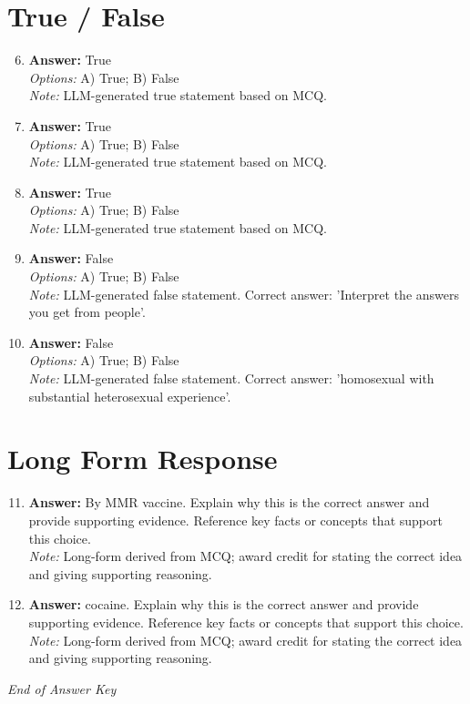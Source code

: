 \documentclass[12pt]{article}
\begin{document}
\section*{True / False}
\begin{enumerate}[label=\arabic*.]
\setcounter{enumi}{5}
\item \textbf{Answer:} True
\\ \textit{Options:} A) True; B) False
\\ \textit{Note:} LLM-generated true statement based on MCQ.
\item \textbf{Answer:} True
\\ \textit{Options:} A) True; B) False
\\ \textit{Note:} LLM-generated true statement based on MCQ.
\item \textbf{Answer:} True
\\ \textit{Options:} A) True; B) False
\\ \textit{Note:} LLM-generated true statement based on MCQ.
\item \textbf{Answer:} False
\\ \textit{Options:} A) True; B) False
\\ \textit{Note:} LLM-generated false statement. Correct answer: 'Interpret the answers you get from people'.
\item \textbf{Answer:} False
\\ \textit{Options:} A) True; B) False
\\ \textit{Note:} LLM-generated false statement. Correct answer: 'homosexual with substantial heterosexual experience'.
\end{enumerate}

\section*{Long Form Response}
\begin{enumerate}[label=\arabic*.]
\setcounter{enumi}{10}
\item \textbf{Answer:} By MMR vaccine. Explain why this is the correct answer and provide supporting evidence. Reference key facts or concepts that support this choice.
\\ \textit{Note:} Long-form derived from MCQ; award credit for stating the correct idea and giving supporting reasoning.
\item \textbf{Answer:} cocaine. Explain why this is the correct answer and provide supporting evidence. Reference key facts or concepts that support this choice.
\\ \textit{Note:} Long-form derived from MCQ; award credit for stating the correct idea and giving supporting reasoning.
\end{enumerate}

\vfill
\noindent\textit{End of Answer Key}
\end{document}
